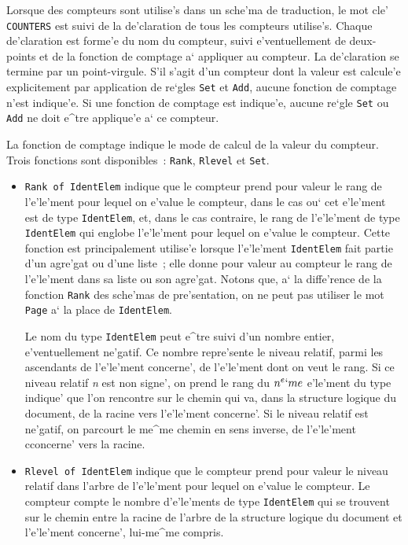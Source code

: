 {Lorsque des compteurs sont utilise's dans un sche'ma de traduction, le
mot cle' {\tt COUNTERS} est suivi de la de'claration de tous les compteurs
utilise's. Chaque de'claration est forme'e du nom du compteur, suivi
e'ventuellement de deux-points et de la fonction de comptage a` appliquer
au compteur. La de'claration se termine par un point-virgule. S'il s'agit
d'un compteur dont la valeur est calcule'e explicitement par application de
re`gles {\tt Set} et {\tt Add}, aucune fonction de comptage n'est indique'e.
Si une fonction de comptage est indique'e, aucune re`gle {\tt Set}
ou {\tt Add} ne doit e^tre applique'e a` ce compteur.

La fonction de comptage indique le mode de calcul de la valeur du compteur.
Trois fonctions sont disponibles~: {\tt Rank}, {\tt Rlevel} et {\tt Set}.

\begin{itemize}
\item
{\tt Rank of IdentElem} indique que le compteur prend pour valeur le rang de
l'e'le'ment pour lequel on e'value le compteur, dans le cas ou` cet e'le'ment est de
type {\tt IdentElem}, et, dans le cas contraire, le rang de l'e'le'ment de type
{\tt IdentElem} qui englobe l'e'le'ment pour lequel on e'value le compteur. Cette
fonction est principalement utilise'e lorsque l'e'le'ment {\tt IdentElem} fait
partie d'un agre'gat ou d'une liste~; elle donne pour valeur au compteur le
rang de l'e'le'ment dans sa liste ou son agre'gat. Notons que, a` la diffe'rence
de la fonction {\tt Rank} des sche'mas de pre'sentation, on ne peut pas
utiliser le mot {\tt Page} a` la place de {\tt IdentElem}.

Le nom du type {\tt IdentElem} peut e^tre suivi d'un nombre entier,
e'ventuellement ne'gatif. Ce nombre repre'sente le niveau relatif, parmi
les ascendants de l'e'le'ment concerne', de l'e'le'ment dont on veut le
rang. Si ce niveau relatif {\it n} est non signe', on prend le rang du $n^e`me$
e'le'ment du type indique' que l'on rencontre sur le chemin qui va, dans
la structure logique du document, de la racine vers l'e'le'ment concerne'.
Si le niveau relatif est ne'gatif, on parcourt le me^me chemin en sens inverse,
de l'e'le'ment cconcerne' vers la racine.

\item
{\tt Rlevel of IdentElem} indique que le compteur prend pour valeur le
niveau relatif dans l'arbre de l'e'le'ment pour lequel on e'value le compteur.
Le compteur compte le nombre d'e'le'ments de type {\tt IdentElem} qui se
trouvent sur le chemin entre la racine de l'arbre de la structure logique
du document et l'e'le'ment concerne', lui-me^me compris.


\end{itemize}}
